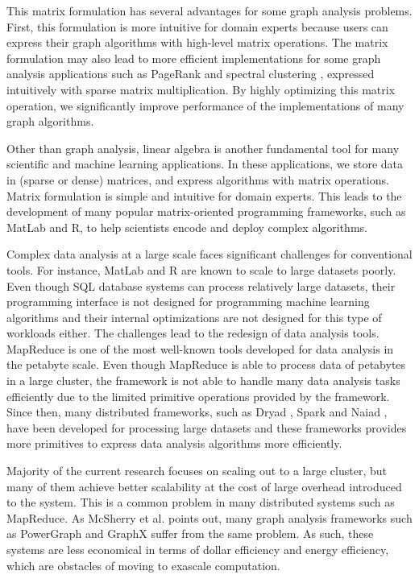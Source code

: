 This matrix formulation has several advantages for some graph analysis problems.
First, this formulation is more intuitive for domain experts because users can
express their graph algorithms with high-level matrix operations. The matrix
formulation may also lead to more efficient implementations for some graph
analysis applications such as PageRank \cite{pagerank} and spectral clustering
\cite{spectral}, expressed intuitively with sparse matrix multiplication.
By highly optimizing this matrix operation, we significantly improve
performance of the implementations of many graph algorithms.

Other than graph analysis, linear algebra is another fundamental tool for many
scientific and machine learning applications. In these applications, we store
data in (sparse or dense) matrices, and express algorithms with matrix
operations. Matrix formulation is simple and intuitive for domain experts.
This leads to the development of many popular matrix-oriented programming
frameworks, such as MatLab and R, to help scientists encode and deploy complex
algorithms.

Complex data analysis at a large scale faces significant challenges for
conventional tools. For instance, MatLab and R are known to scale to large
datasets poorly. Even though SQL database systems can process relatively large
datasets, their programming interface is not designed for programming machine
learning algorithms and their internal optimizations are not designed for this
type of workloads either.
The challenges lead to the redesign of data analysis tools.
MapReduce \cite{mapreduce} is one of the most well-known tools developed for
data analysis in the petabyte scale. Even though MapReduce is able to
process data of petabytes in a large cluster, the framework is not able to
handle many data analysis tasks efficiently due to the limited primitive
operations provided by the framework. Since then, many distributed frameworks,
such as Dryad \cite{dryad}, Spark \cite{spark} and Naiad \cite{naiad}, have
been developed for processing large datasets and these frameworks provides
more primitives to express data analysis algorithms more efficiently.

Majority of the current research focuses on scaling out to a large cluster,
but many of them achieve better scalability at the cost of large overhead
introduced to the system. This is a common problem in many distributed systems
such as MapReduce. As McSherry et al. \cite{mcsherry15}
points out, many graph analysis frameworks such as PowerGraph \cite{powergraph}
and GraphX \cite{graphx} suffer from the same problem. As such, these systems
are less economical in terms of dollar efficiency and energy efficiency, which
are obstacles of moving to exascale computation.

